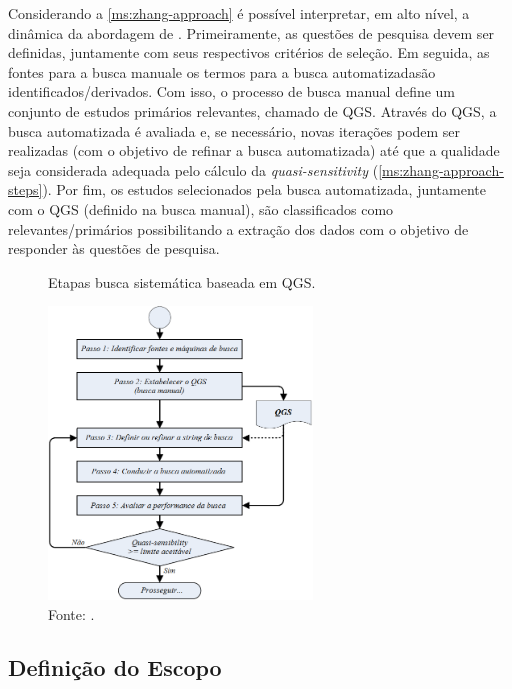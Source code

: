 Considerando a \autoref{ms:zhang-approach} é possível interpretar, em alto nível, a dinâmica da abordagem de . Primeiramente, as questões de pesquisa devem ser definidas, juntamente com seus respectivos critérios de seleção. Em seguida, as fontes para a busca manuale os termos para a busca automatizadasão identificados/derivados. Com isso, o processo de busca manual define um conjunto de estudos primários relevantes, chamado de QGS. Através do QGS, a busca automatizada é avaliada e, se necessário, novas iterações podem ser realizadas (com o objetivo de refinar a busca automatizada) até que a qualidade seja considerada adequada pelo cálculo da \textit{quasi-sensitivity} (\autoref{ms:zhang-approach-steps}). Por fim, os estudos selecionados pela busca automatizada, juntamente com o QGS (definido na busca manual), são classificados como relevantes/primários possibilitando a extração dos dados com o objetivo de responder às questões de pesquisa.

\begin{figure}[htbp]
\caption{Etapas busca sistemática baseada em QGS.}
\label{ms:zhang-approach-steps}
\centerline{\includegraphics[width=0.625\textwidth]{images/zhang-systematic-mapping-steps.png}}
\caption*{Fonte: .}
\end{figure}

\subsection{Definição do Escopo}
\label{ms:conducao-escopo}

